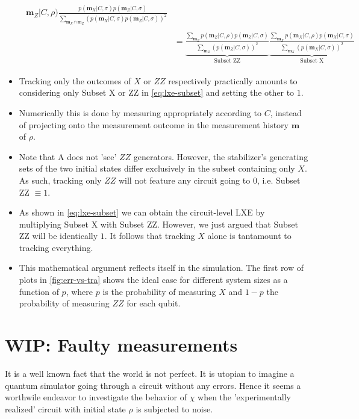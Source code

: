 \begin{itemize}
\begin{align}
\begin{split}
        \mathbf{m}_Z | C, \rho) \frac{p(\mathbf{m}_X | C, \sigma) p( \mathbf{m}_Z|
        C, \sigma)}{\sum_{\mathbf{m}_X \cap \mathbf{m}_Z} \left(p(\mathbf{m}_X | C,
        \sigma) p( \mathbf{m}_Z|C,\sigma)\right)^2}\\
        \\
      &= \underbrace{\frac{\sum_{\mathbf{m}_Z} p(\mathbf{m}_Z | C, \rho)
          p(\mathbf{m}_Z | C, \sigma)}{\sum_{\mathbf{m}_Z} \left(p(\mathbf{m}_Z |
          C, \sigma)\right)^2}}_{\text{Subset ZZ}}
          \underbrace{\frac{\sum_{\mathbf{m}_X} p(\mathbf{m}_X | C, \rho)
          p(\mathbf{m}_X | C, \sigma)}{\sum_{\mathbf{m}_X} \left(p(\mathbf{m}_X |
          C, \sigma)\right)^2}}_{\text{Subset X}}
    \end{split}
    \end{align}
  \item Tracking only the outcomes of $X$ or $ZZ$ respectively practically
    amounts to considering only Subset X or ZZ in \cref{eq:lxe-subset} and
    setting the other to $1$.
  \item Numerically this is done by measuring appropriately according to $C$,
    instead of projecting onto the measurement outcome in the measurement
    history $\mathbf{m}$ of $\rho$.
  \item Note that \textsf{A} does not 'see' $ZZ$ generators. However, the
    stabilizer's generating sets of the two initial states differ exclusively in the subset
    containing only $X$. As such, tracking only $ZZ$ will not feature any
    circuit going to $0$, i.e. Subset ZZ $\equiv 1$.
  \item As shown in \cref{eq:lxe-subset} we can obtain the circuit-level LXE by
    multiplying Subset X with Subset ZZ. However, we just argued that Subset ZZ
    will be identically $1$. It follows that tracking $X$ alone is tantamount
    to tracking everything.
  \item This mathematical argument reflects itself in the simulation. The first
    row of plots in \cref{fig:err-vs-tra} shows the ideal case for different
    system sizes as a function of $p$, where $p$ is the probability of
    measuring $X$ and $1-p$ the probability of measuring $ZZ$ for each qubit.
\end{itemize}
    
\section{WIP: Faulty measurements}
It is a well known fact that the world is not perfect. It is utopian to imagine
a quantum simulator going through a circuit without any errors. Hence it seems
a worthwile endeavor to investigate the behavior of $\chi$ when the
'experimentally realized' circuit with initial state $\rho$ is subjected to
noise.

